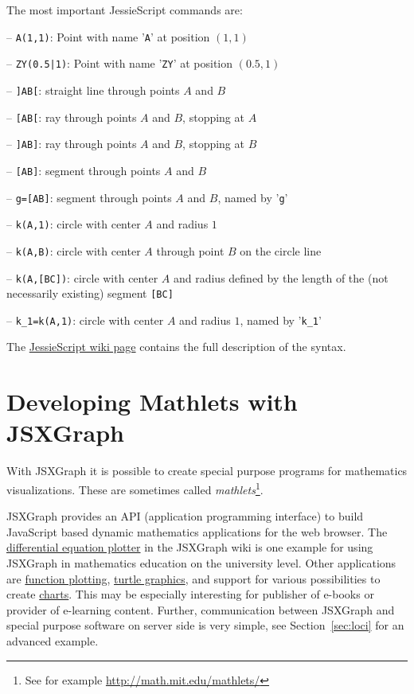 \documentclass[12pt,a4paper]{article}%
\begin{document}
The most important JessieScript commands are:
\begin{description}
\item{-- \verb+A(1,1)+:} Point with name '\verb|A|' at position $(1,1)$
\item{-- \verb+ZY(0.5|1)+:} Point with name '\verb|ZY|' at position $(0.5,1)$
\item{-- \verb|]AB[|:} straight line through points $A$ and $B$
\item{-- \verb|[AB[|:} ray through points $A$ and $B$, stopping at $A$
\item{-- \verb|]AB]|:} ray through points $A$ and $B$, stopping at $B$
\item{-- \verb|[AB]|:} segment through points $A$ and $B$
\item{-- \verb|g=[AB]|:} segment through points $A$ and $B$, named by '\verb|g|'
\item{-- \verb|k(A,1)|:} circle with center $A$ and radius $1$
\item{-- \verb|k(A,B)|:} circle with center $A$ through point $B$ on the circle line
\item{-- \verb|k(A,[BC])|:} circle with center $A$ and radius defined by the length of the 
(not necessarily existing) segment \verb|[BC]|
\item{-- \verb|k_1=k(A,1)|:} circle with center $A$ and radius $1$, named by '\verb|k_1|' 
\end{description}
The \href{http://jsxgraph.uni-bayreuth.de/wiki/index.php/Geometric_constructions_with_JessieScript}{JessieScript wiki page} contains the full description of the syntax.


\section{Developing Mathlets with JSXGraph}
With JSXGraph it is possible to create special purpose programs for mathematics visualizations.
These are sometimes called {\sl mathlets}\footnote{See for example
\href{http://math.mit.edu/mathlets/}{http://math.mit.edu/mathlets/}}.

JSXGraph provides an API (application programming interface) to build JavaScript based 
dynamic mathematics applications for the web browser. 
The \href{http://jsxgraph.uni-bayreuth.de/wiki/index.php/Differential_equations}{differential equation plotter}
in the JSXGraph wiki is one example for using JSXGraph in mathematics 
education on the university level. 
Other applications are 
\href{http://jsxgraph.uni-bayreuth.de/wiki/index.php/Even_simpler_function_plotter}{function plotting}, 
\href{http://jsxgraph.uni-bayreuth.de/wiki/index.php/Programming_turtle_graphics}{turtle graphics}, 
and support for various possibilities to create 
\href{http://jsxgraph.uni-bayreuth.de/wiki/index.php/Category:Charts}{charts}. 
This may be especially interesting for publisher of e-books or provider of e-learning 
content. 
Further, communication between JSXGraph and special purpose software on server side is very simple, see 
Section~\ref{sec:loci} for an advanced example.
\end{document}

